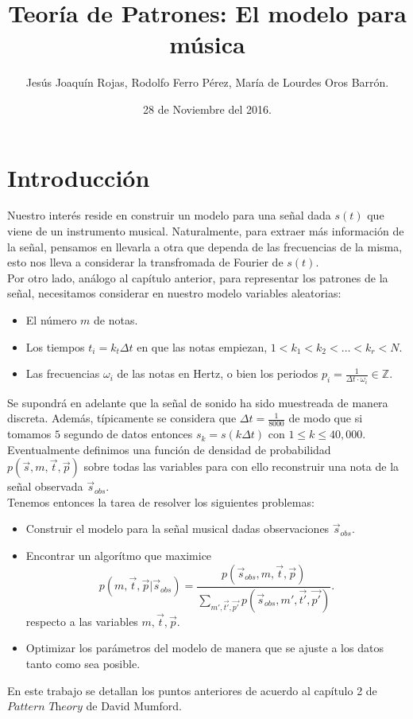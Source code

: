 \documentclass[a4paper]{article}
\title{\textbf{Teoría de Patrones: El modelo para música}}
\author{Jesús Joaquín Rojas, Rodolfo Ferro Pérez, María de Lourdes Oros Barrón.}
\date{28 de Noviembre del 2016.}
\begin{document}
\sffamily
\maketitle

\section{\sffamily Introducción}
Nuestro interés reside en construir un modelo para una señal dada $s(t)$ que viene de un instrumento musical. Naturalmente, para extraer más información de la señal, pensamos en llevarla a otra que dependa de las frecuencias de la misma, esto nos lleva a considerar la transfromada de Fourier de $s(t)$.\\
Por otro lado, análogo al capítulo anterior, para representar los patrones de la señal, necesitamos considerar en nuestro modelo variables aleatorias:
\begin{itemize}
\item El número $m$ de notas.
\item Los tiempos $t_{i}=k_{t}\Delta t$ en que las notas empiezan, $1 < k_{1} <k_{2}< \dots <k_{r}<N$.
\item Las frecuencias $\omega_{i}$ de las notas en Hertz, o bien los periodos $p_{i}=\frac{1}{\Delta t\cdot \omega_{i}} \in \mathbb{Z}$.
\end{itemize}
Se supondrá en adelante que la señal de sonido ha sido muestreada de manera discreta. Además, típicamente se considera que $\Delta t=\frac{1}{8000}$ de modo que si tomamos $5$ segundo de datos entonces $s_{k}=s(k\Delta t)$ con $1 \leq k \leq 40,000$. \\

\noindent Eventualmente definimos una función de densidad de probabilidad $p(\overrightarrow{s},m,\overrightarrow{t},\overrightarrow{p})$ sobre todas las variables para con ello reconstruir una nota de la señal observada $\overrightarrow{s}_{obs}$.\\

Tenemos entonces la tarea de resolver los siguientes problemas:
\begin{itemize}
\item Construir el modelo para la señal musical dadas observaciones $\overrightarrow{s}_{obs}$.
\item Encontrar un algorítmo que maximice $$p(m,\overrightarrow{t},\overrightarrow{p}|\overrightarrow{s}_{obs})=\frac{p(\overrightarrow{s}_{obs},m,\overrightarrow{t},\overrightarrow{p})}{\sum_{m',\overrightarrow{t'},\overrightarrow{p'}}p(\overrightarrow{s}_{obs},m',\overrightarrow{t'},\overrightarrow{p'})}.$$ respecto a las variables $m,\overrightarrow{t},\overrightarrow{p}.$
\item Optimizar los parámetros del modelo de manera que se ajuste a los datos tanto como sea posible.
\end{itemize}
En este trabajo se detallan los puntos anteriores de acuerdo al capítulo 2 de $\textit{Pattern Theory}$ de David Mumford. \\
\end{document}
